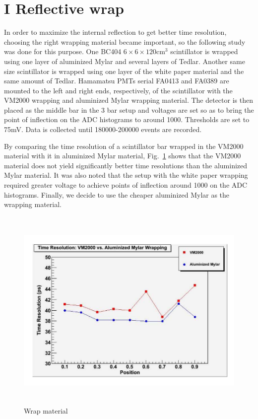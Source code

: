 \section{I Reflective wrap }


In order to maximize the internal reflection to get better time resolution, choosing the right wrapping material became important, so the following study was done for this purpose.
One BC404 $6 \times 6 \times 120${cm}$^3 $ scintillator is wrapped using one layer of aluminized Mylar and several layers of Tedlar. Another same size scintillator is wrapped using one layer of the white paper material and the same amount of Tedlar. Hamamatsu PMTs serial FA0413 and FA0389 are mounted to the left and right ends, respectively, of the scintillator with the VM2000 wrapping and aluminized Mylar wrapping material. The detector is then placed as the middle bar in the 3 bar setup and voltages are set so as to bring the point of inflection on the ADC histograms to around 1000. Thresholds are set to 75mV. Data is collected until 180000-200000 events are recorded.

By comparing the time resolution of a scintillator bar wrapped in the VM2000 material with it in aluminized Mylar material, Fig.~\ref{f:wrap} shows that the VM2000 material does not yield significantly better time resolutions than the aluminized Mylar material. It was also noted that the setup with the white paper wrapping required greater voltage to achieve points of inflection around 1000 on the ADC histograms. Finally, we decide to use the cheaper aluminized Mylar as the wrapping material.
\vspace{20mm}
\begin{figure}[h]
\centerline{\includegraphics[width=13cm,height=10cm]{ye/fig_ye_wrap/R1.pdf}}
\caption{Wrap material}
\label{f:wrap}
\end{figure}

